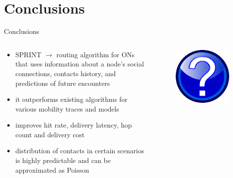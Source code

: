 \documentclass{beamer}
\begin{document}
\section{Conclusions}

\begin{frame}{Conclusions}
  \begin{columns}
    \begin{column}[l]{0.7\textwidth}
      \begin{itemize}
        \item SPRINT $\rightarrow$ routing algorithm for ONs that uses information about a node's social connections, contacts history, and predictions of future encounters
		\item it outperforms existing algorithms for various mobility traces and models
		\item improves hit rate, delivery latency, hop count and delivery cost
		\item distribution of contacts in certain scenarios is highly predictable and can be approximated as Poisson
      \end{itemize}
    \end{column}
    \begin{column}[c]{0.3\textwidth}
      \begin{figure}
        \includegraphics[scale=0.2]{img/question-mark}
      \end{figure}
    \end{column}
  \end{columns}
\end{frame}
\end{document}

